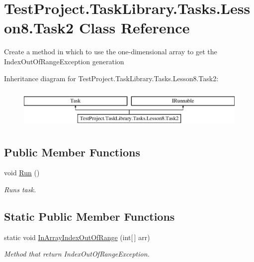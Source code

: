 \hypertarget{class_test_project_1_1_task_library_1_1_tasks_1_1_lesson8_1_1_task2}{}\section{Test\+Project.\+Task\+Library.\+Tasks.\+Lesson8.\+Task2 Class Reference}
\label{class_test_project_1_1_task_library_1_1_tasks_1_1_lesson8_1_1_task2}


Create a method in which to use the one-\/dimensional array to get the Index\+Out\+Of\+Range\+Exception generation  


Inheritance diagram for Test\+Project.\+Task\+Library.\+Tasks.\+Lesson8.\+Task2\+:\begin{figure}[H]
\begin{center}
\leavevmode
\includegraphics[height=2.000000cm]{class_test_project_1_1_task_library_1_1_tasks_1_1_lesson8_1_1_task2}
\end{center}
\end{figure}
\subsection*{Public Member Functions}
\begin{DoxyCompactItemize}
\item 
void \mbox{\hyperlink{class_test_project_1_1_task_library_1_1_tasks_1_1_lesson8_1_1_task2_afb8ae5e5dd2f9e12b9e47e428e67775a}{Run}} ()
\begin{DoxyCompactList}\small\item\em Runs task. \end{DoxyCompactList}\end{DoxyCompactItemize}
\subsection*{Static Public Member Functions}
\begin{DoxyCompactItemize}
\item 
static void \mbox{\hyperlink{class_test_project_1_1_task_library_1_1_tasks_1_1_lesson8_1_1_task2_aa9ba53ce2b0496ad1d44d98ffe28b137}{In\+Array\+Index\+Out\+Of\+Range}} (int\mbox{[}$\,$\mbox{]} arr)
\begin{DoxyCompactList}\small\item\em Method that return Index\+Out\+Of\+Range\+Exception. \end{DoxyCompactList}\end{DoxyCompactItemize}


